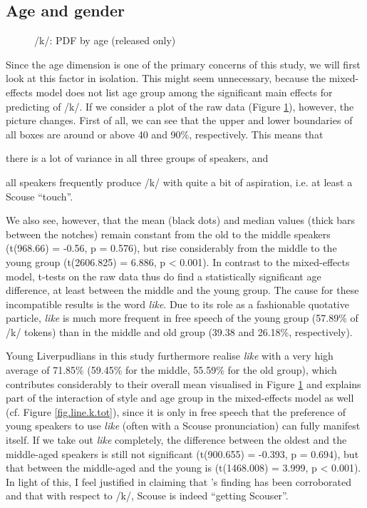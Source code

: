 \subsection{Age and gender}
\label{sec.prod.res.con.k.agegender}

\begin{figure}[h]
	\centering
		\resizebox{0.5\linewidth}{!}{} 
	\caption{/k/: PDF by age (released only)}
	\label{fig.box.k.tot}
\end{figure}

Since the age dimension is one of the primary concerns of this study, we will first look at this factor in isolation.
This might seem unnecessary, because the mixed-effects model does not list age group among the significant main effects for predicting  of /k/.
If we consider a plot of the raw data (Figure \ref{fig.box.k.tot}), however, the picture changes.
First of all, we can see that the upper and lower boundaries of all boxes are around or above 40 and 90\%, respectively.
This means that
\begin{inparaenum}[(a)]
	\item there is a lot of variance in all three groups of speakers, and
	\item all speakers frequently produce /k/ with quite a bit of aspiration, i.e. at least a Scouse ``touch''.
\end{inparaenum}
We also see, however, that the mean (black dots) and median values (thick bars between the notches) remain constant from the old to the middle speakers (t(968.66) = -0.56, p = 0.576), but rise considerably from the middle to the young group (t(2606.825) = 6.886, p < 0.001).
In contrast to the mixed-effects model, t-tests on the raw data thus do find a statistically significant age difference, at least between the middle and the young group.
The cause for these incompatible results is the word \emph{like}.
Due to its role as a fashionable quotative particle, \emph{like} is much more frequent in free speech of the young group (57.89\% of /k/ tokens) than in the middle and old group (39.38 and 26.18\%, respectively).

Young Liverpudlians in this study furthermore realise \emph{like} with a very high average  of 71.85\% (59.45\% for the middle, 55.59\% for the old group), which contributes considerably to their overall mean visualised in Figure \ref{fig.box.k.tot} and explains part of the interaction of style and age group in the mixed-effects model as well (cf. Figure \ref{fig.line.k.tot}), since it is only in free speech that the preference of young speakers to use \emph{like} (often with a Scouse pronunciation) can fully manifest itself.
If we take out \emph{like} completely, the difference between the oldest and the middle-aged speakers is still not significant (t(900.655) = -0.393, p = 0.694), but that between the middle-aged and the young is (t(1468.008) = 3.999, p < 0.001).
In light of this, I feel justified in claiming that \citeauthor{watson2007a}'s \citeyearpar{watson2007a} finding has been corroborated and that with respect to /k/, Scouse is indeed ``getting Scouser''.


